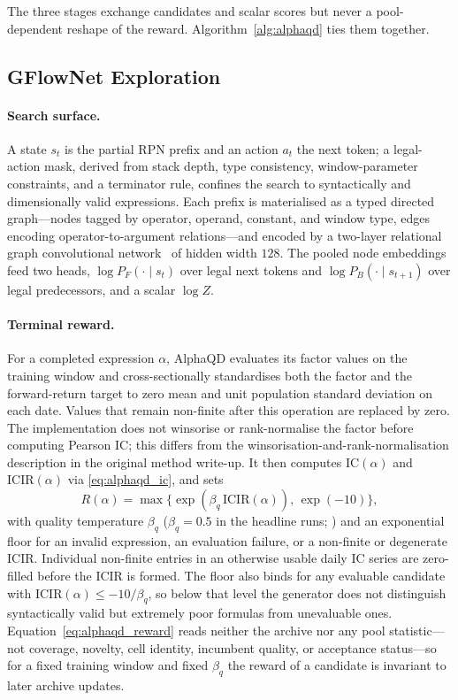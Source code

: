 The three stages exchange candidates and scalar scores but never a pool-dependent reshape of the reward. Algorithm~\ref{alg:alphaqd} ties them together.

\subsection{GFlowNet Exploration}
\label{sec:alphaqd_generator}

\paragraph{Search surface.} A state $s_t$ is the partial RPN prefix and an action $a_t$ the next token; a legal-action mask, derived from stack depth, type consistency, window-parameter constraints, and a terminator rule, confines the search to syntactically and dimensionally valid expressions. Each prefix is materialised as a typed directed graph---nodes tagged by operator, operand, constant, and window type, edges encoding operator-to-argument relations---and encoded by a two-layer relational graph convolutional network~\cite{schlichtkrull2018rgcn} of hidden width $128$. The pooled node embeddings feed two heads, $\log P_F(\cdot\mid s_t)$ over legal next tokens and $\log P_B(\cdot\mid s_{t+1})$ over legal predecessors, and a scalar $\log Z$.

\paragraph{Terminal reward.} For a completed expression $\alpha$, AlphaQD evaluates its factor values on the training window and cross-sectionally standardises both the factor and the forward-return target to zero mean and unit population standard deviation on each date. Values that remain non-finite after this operation are replaced by zero. The implementation does not winsorise or rank-normalise the factor before computing Pearson IC; this differs from the winsorisation-and-rank-normalisation description in the original method write-up. It then computes $\mathrm{IC}(\alpha)$ and $\mathrm{ICIR}(\alpha)$ via \eqref{eq:alphaqd_ic}, and sets
\begin{equation}
\label{eq:alphaqd_reward}
R(\alpha) = \max\!\bigl\{\exp(\beta_q\,\mathrm{ICIR}(\alpha)),\,\exp(-10)\bigr\},
\end{equation}
with quality temperature $\beta_q$ ($\beta_q=0.5$ in the headline runs; ) and an exponential floor for an invalid expression, an evaluation failure, or a non-finite or degenerate ICIR. Individual non-finite entries in an otherwise usable daily IC series are zero-filled before the ICIR is formed. The floor also binds for any evaluable candidate with $\mathrm{ICIR}(\alpha)\le -10/\beta_q$, so below that level the generator does not distinguish syntactically valid but extremely poor formulas from unevaluable ones. Equation~\eqref{eq:alphaqd_reward} reads neither the archive nor any pool statistic---not coverage, novelty, cell identity, incumbent quality, or acceptance status---so for a fixed training window and fixed $\beta_q$ the reward of a candidate is invariant to later archive updates.

